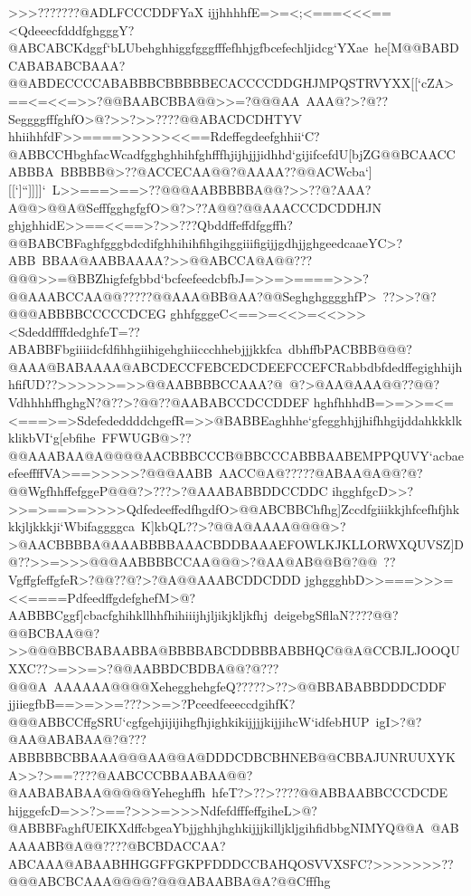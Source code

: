 {{{ >>>???????@ADLFCCCDDFYaX}
 \hbox{ijjhhhhfE=>=<;<===<<<==<QdeeecfdddfghgggY?@ABCABCKdggf`bLUbehghhiggfgggfffefhhjgfbcefechljidcg`YXae%
 he[M@@BABDCABABABCBAAA?@@ABDECCCCABABBBCBBBBBECACCCCDDGHJMPQSTRVYXX[[`cZA>==<=<<=>>?@@BAABCBBA@@>>=?@@@AA%
 AAA@?>?@??SeggggfffghfO>@?>>?>>????@@ABACDCDHTYV}
 \hbox{hhiihhfdF>>====>>>>><<==Rdeffegdeefghhii`C?@ABBCCHbghfacWcadfgghghhihfghfffhjijhjjjidhhd`gijifcefdU[bjZG@@BCAACCABBBA%
 BBBBB@>??@ACCECAA@@?@AAAA??@@ACWcba`][[`]``]]]]`%
 L>>===>==>??@@@AABBBBBA@@?>>??@?AAA?A@@>@@A@SefffgghgfgfO>@?>??A@@?@@AAACCCDCDDHJN}
 \hbox{ghjghhidE>>==<<==>?>>???Qbddffeffdfggffh?@@BABCBFaghfgggbdcdifghhihihfihgihggiiifigijjgdhjjghgeedcaaeYC>?ABB%
 BBAA@AABBAAAA?>>@@ABCCA@A@@???@@@>>=@BBZhigfefgbbd`bcfeefeedcbfbJ=>>=>====>>>?@@AAABCCAA@@?????@@AAA@BB@AA?@@SeghghgggghfP>%
 ??>>?@?@@@ABBBBCCCCCDCEG}
 \hbox{ghhfgggeC<==>=<<>=<<>>><SdeddffffdedghfeT=??ABABBFbgiiiidcfdfihhgiihigehghiiccchhebjjjkkfca%
 dbhffbPACBBB@@@?@AAA@BABAAAA@ABCDECCFEBCEDCDEEFCCEFCRabbdbfdedffegighhijhhfifUD??>>>>>>=>>@@AABBBBCCAAA?@%
 @?>@AA@AAA@@??@@?VdhhhhffhghgN?@??>?@@??@AABABCCDCCDDEF}
 \hbox{hghfhhhdB=>=>>=<=<===>=>SdefededdddchgefR=>>@BABBEaghhhe`gfegghhjjhifhhgijddahkkklkklikbVI`g[ebfihe%
 FFWUGB@>??@@AAABAA@A@@@@AACBBBCCCB@BBCCCABBBAABEMPPQUVY`acbaeefeeffffVA>==>>>>>?@@@AABB%
 AACC@A@?????@ABAA@A@@?@?@@WgfhhffefggeP@@@?>???>?@AAABABBDDCCDDC}
 \hbox{ihgghfgcD>>?>>=>==>=>>>>QdfedeeffedfhgdfO>@@ABCBBChfhg]Zccdfgiiikkjhfcefhfjhkkkjljkkkji`Wbifaggggca%
 K]kbQL??>?@@A@AAAA@@@@>?>@AACBBBBA@AAABBBBAAACBDDBAAAEFOWLKJKLLORWXQUVSZ]D@??>>=>>>@@@AABBBBCCAA@@@>?@AA@AB@@B@?@@%
 ??VgffgfeffgfeR>?@@??@?>?@A@@AAABCDDCDDD}
 \hbox{jghggghbD>>===>>>=<<====PdfeedffgdefghefM>@?AABBBCggf]cbacfghihkllhhfhihiiijhjljikjkljkfhj%
 deigebgSfllaN????@@?@@BCBAA@@?>>@@@BBCBABAABBA@BBBBABCDDBBBABBHQC@@A@CCBJLJOOQUXXC??>=>>=>?@@AABBDCBDBA@@?@???@@@A%
 AAAAAA@@@@XehegghehgfeQ?????>??>@@BBABABBDDDCDDF}
 \hbox{jjiiegfbB==>=>>=???>>=>?PceedfeeeccdgihfK?@@@ABBCCffgSRU`cgfgehjijijihgfhjighkikijjjjkijjihcW`idfebHUP%
 igI>?@?@AA@ABABAA@?@???ABBBBBCBBAAA@@@AA@@A@DDDCDBCBHNEB@@CBBAJUNRUUXYKA>>?>==????@AABCCCBBAABAA@@?@AABABABAA@@@@@Yeheghffh%
 hfeT?>??>????@@ABBAABBCCCDCDE}
 \hbox{hijggefcD=>>?>==?>>>=>>>NdfefdfffeffgiheL>@?@ABBBFaghfUEIKXdffcbgeaYbjjghhjhghkijjjkilljkljgihfidbbgNIMYQ@@A%
 @ABAAAABB@A@@????@BCBDACCAA?ABCAAA@ABAABHHGGFFGKPFDDDCCBAHQOSVVXSFC?>>>>>>>??@@@ABCBCAAA@@@@?@@@ABAABBA@A?@@Cfffhg%
}}}
